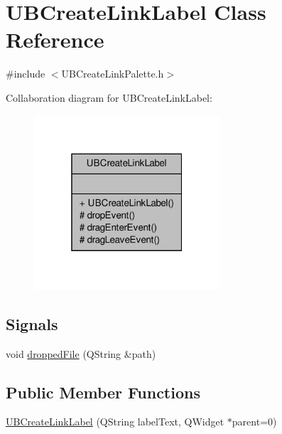 \hypertarget{class_u_b_create_link_label}{\section{U\-B\-Create\-Link\-Label Class Reference}
\label{d5/d5d/class_u_b_create_link_label}
}


{\ttfamily \#include $<$U\-B\-Create\-Link\-Palette.\-h$>$}



Collaboration diagram for U\-B\-Create\-Link\-Label\-:
\nopagebreak
\begin{figure}[H]
\begin{center}
\leavevmode
\includegraphics[width=196pt]{de/dd0/class_u_b_create_link_label__coll__graph}
\end{center}
\end{figure}
\subsection*{Signals}
\begin{DoxyCompactItemize}
\item 
void \hyperlink{class_u_b_create_link_label_aed5d9df374491a899c0f18cac99fbaf4}{dropped\-File} (Q\-String \&path)
\end{DoxyCompactItemize}
\subsection*{Public Member Functions}
\begin{DoxyCompactItemize}
\item 
\hyperlink{class_u_b_create_link_label_ad51146160bca1f32360d79ea0b806302}{U\-B\-Create\-Link\-Label} (Q\-String label\-Text, Q\-Widget $\ast$parent=0)
\end{DoxyCompactItemize}
